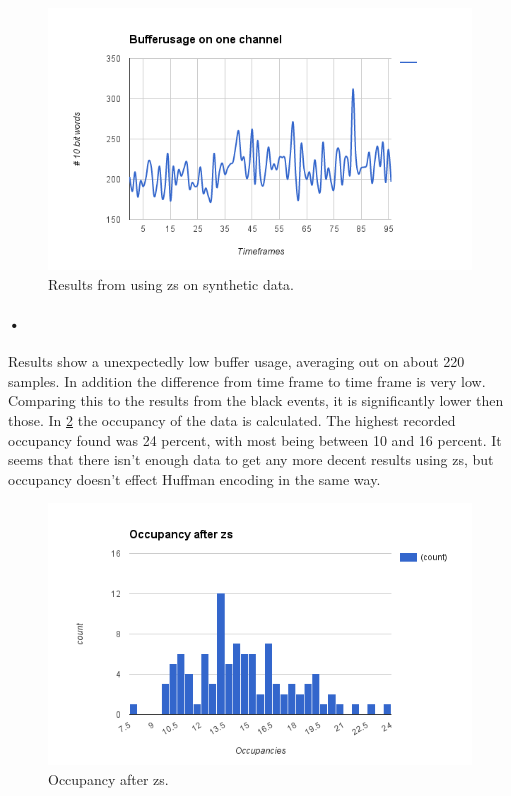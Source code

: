 \documentclass[a4paper, 12pt]{report}
\begin{document}
\begin{figure}[h!]
	\centering
		\includegraphics[width=1.0\textwidth]{images/bufferuse-one-channel-fake-pileup.png}
		\caption{Results from using \gls{zs} on synthetic data.}
		\label{fig:synthetic-zs}
\end{figure}

\paragraph{•}
Results show a unexpectedly low buffer usage, averaging out on about 220 samples.
In addition the difference from time frame to time frame is very low.
Comparing this to the results from the black events, it is significantly lower then those.
In \ref{fig:occ-synt-zs} the occupancy of the data is calculated.
The highest recorded occupancy found was 24 percent, with most being between 10 and 16 percent.
It seems that there isn't enough data to get any more decent results using \gls{zs}, but occupancy doesn't effect Huffman encoding in the same way.

\begin{figure}[h!]
	\centering
		\includegraphics[width=1.0\textwidth]{images/occ-after-zs.png}
		\caption{Occupancy after \gls{zs}.}
		\label{fig:occ-synt-zs}
\end{figure}
\end{document}
